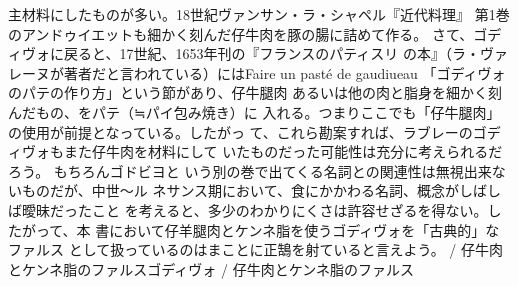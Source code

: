 {{{{  主材料にしたものが多い。18世紀ヴァンサン・ラ・シャペル『近代料理』
  第1巻のアンドゥイエットも細かく刻んだ仔牛肉を豚の腸に詰めて作る。
  さて、ゴディヴォに戻ると、17世紀、1653年刊の『フランスのパティスリ
  の本』（ラ・ヴァレーヌが著者だと言われている）にはFaire un pasté de
  gaudiueau 「ゴディヴォのパテの作り方」という節があり、仔牛腿肉
  あるいは他の肉と脂身を細かく刻んだもの、をパテ（≒パイ包み焼き）に
  入れる。つまりここでも「仔牛腿肉」の使用が前提となっている。したがっ
  て、これら勘案すれば、ラブレーのゴディヴォもまた仔牛肉を材料にして
  いたものだった可能性は充分に考えられるだろう。 もちろんゴドビヨと
  いう別の巻で出てくる名詞との関連性は無視出来ないものだが、中世〜ル
  ネサンス期において、食にかかわる名詞、概念がしばしば曖昧だったこと
  を考えると、多少のわかりにくさは許容せざるを得ない。したがって、本
  書において仔羊腿肉とケンネ脂を使うゴディヴォを「古典的」なファルス
  として扱っているのはまことに正鵠を射ていると言えよう。} /
仔牛肉とケンネ脂のファルス}{ゴディヴォ / 仔牛肉とケンネ脂のファルス}}\label{godiveau}}


